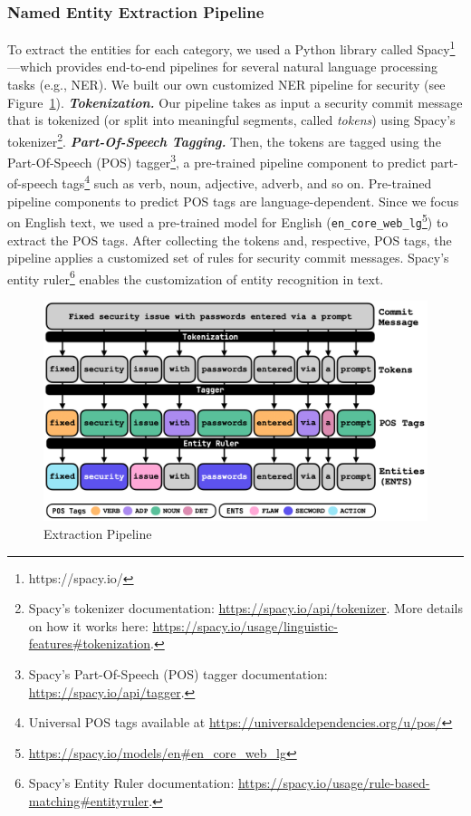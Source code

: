 \subsubsection{Named Entity Extraction Pipeline} To extract the 
entities for each category, we used a Python library called Spacy\footnote{https://spacy.io/}---which provides end-to-end 
pipelines for several natural language processing tasks (e.g., NER). We built our own customized NER pipeline for security (see Figure~\ref{fig:parsing}). \textit{\textbf{Tokenization.}} Our pipeline 
takes as input a security commit message that is tokenized (or split into meaningful segments, called \emph{tokens}) using Spacy's tokenizer\footnote{Spacy's tokenizer documentation: \url{https://spacy.io/api/tokenizer}. More 
details on how it works here: \url{https://spacy.io/usage/linguistic-features\#tokenization}.}.
\textit{\textbf{Part-Of-Speech Tagging.}} Then, the tokens are tagged using the Part-Of-Speech (POS) 
tagger\footnote{Spacy's Part-Of-Speech (POS) tagger documentation: 
\url{https://spacy.io/api/tagger}.}, a pre-trained pipeline component to predict part-of-speech 
tags\footnote{Universal POS tags available at \url{https://universaldependencies.org/u/pos/}} 
such as verb, noun, adjective, adverb, and so on.
Pre-trained pipeline components to predict POS
tags are language-dependent. Since we focus on English text, 
we used a pre-trained model for English 
 (\texttt{en\_core\_web\_lg}\footnote{\url{https://spacy.io/models/en\#en\_core\_web\_lg}}) to extract the POS tags.
After collecting the tokens and, respective, POS tags, the 
pipeline applies a customized set of rules for security commit messages. Spacy's entity ruler\footnote{Spacy's Entity Ruler documentation: \url{https://spacy.io/usage/rule-based-matching\#entityruler}.} enables the customization 
of entity recognition in text. 

\begin{figure}[t!]
\hspace*{-0.25cm}\centering
    \includegraphics[scale=0.36]{Figures/parsing.png}
    \caption{Extraction Pipeline}\label{fig:parsing}
\end{figure}



